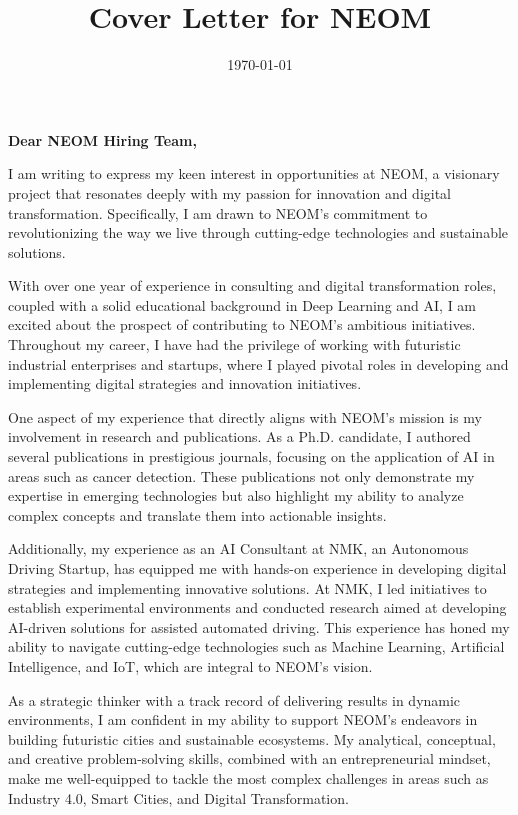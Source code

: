 \documentclass[11pt]{article}
\date{\today}
\title{Cover Letter for NEOM}
\begin{document}
\maketitle
\textbf{Dear NEOM Hiring Team,}

I am writing to express my keen interest in opportunities at NEOM, a visionary project that resonates deeply with my passion for innovation and digital transformation. Specifically, I am drawn to NEOM's commitment to revolutionizing the way we live through cutting-edge technologies and sustainable solutions.

With over one year of experience in consulting and digital transformation roles, coupled with a solid educational background in Deep Learning and AI, I am excited about the prospect of contributing to NEOM's ambitious initiatives. Throughout my career, I have had the privilege of working with futuristic industrial enterprises and startups, where I played pivotal roles in developing and implementing digital strategies and innovation initiatives.

One aspect of my experience that directly aligns with NEOM's mission is my involvement in research and publications. As a Ph.D. candidate, I authored several publications in prestigious journals, focusing on the application of AI in areas such as cancer detection. These publications not only demonstrate my expertise in emerging technologies but also highlight my ability to analyze complex concepts and translate them into actionable insights.

Additionally, my experience as an AI Consultant at NMK, an Autonomous Driving Startup, has equipped me with hands-on experience in developing digital strategies and implementing innovative solutions. At NMK, I led initiatives to establish experimental environments and conducted research aimed at developing AI-driven solutions for assisted automated driving. This experience has honed my ability to navigate cutting-edge technologies such as Machine Learning, Artificial Intelligence, and IoT, which are integral to NEOM's vision.

As a strategic thinker with a track record of delivering results in dynamic environments, I am confident in my ability to support NEOM's endeavors in building futuristic cities and sustainable ecosystems. My analytical, conceptual, and creative problem-solving skills, combined with an entrepreneurial mindset, make me well-equipped to tackle the most complex challenges in areas such as Industry 4.0, Smart Cities, and Digital Transformation.
\end{document}
